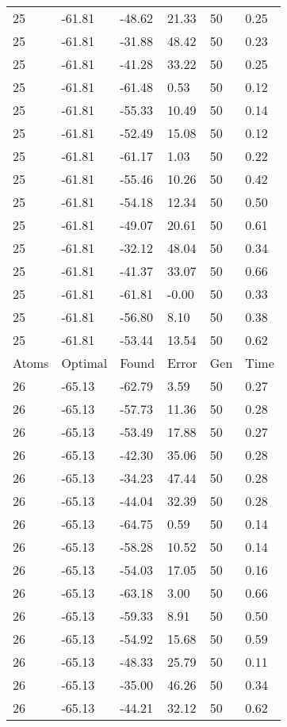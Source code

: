 \documentclass{report}
\begin{document}
\begin{appendix}
\begin{longtable}{llllll}
25 & -61.81 & -48.62 & 21.33 & 50 & 0.25 \\
25 & -61.81 & -31.88 & 48.42 & 50 & 0.23 \\
25 & -61.81 & -41.28 & 33.22 & 50 & 0.25 \\
25 & -61.81 & -61.48 & 0.53 & 50 & 0.12 \\
25 & -61.81 & -55.33 & 10.49 & 50 & 0.14 \\
25 & -61.81 & -52.49 & 15.08 & 50 & 0.12 \\
25 & -61.81 & -61.17 & 1.03 & 50 & 0.22 \\
25 & -61.81 & -55.46 & 10.26 & 50 & 0.42 \\
25 & -61.81 & -54.18 & 12.34 & 50 & 0.50 \\
25 & -61.81 & -49.07 & 20.61 & 50 & 0.61 \\
25 & -61.81 & -32.12 & 48.04 & 50 & 0.34 \\
25 & -61.81 & -41.37 & 33.07 & 50 & 0.66 \\
25 & -61.81 & -61.81 & -0.00 & 50 & 0.33 \\
25 & -61.81 & -56.80 & 8.10 & 50 & 0.38 \\
25 & -61.81 & -53.44 & 13.54 & 50 & 0.62 \\
Atoms & Optimal & Found & Error & Gen & Time \\
26 & -65.13 & -62.79 & 3.59 & 50 & 0.27 \\
26 & -65.13 & -57.73 & 11.36 & 50 & 0.28 \\
26 & -65.13 & -53.49 & 17.88 & 50 & 0.27 \\
26 & -65.13 & -42.30 & 35.06 & 50 & 0.28 \\
26 & -65.13 & -34.23 & 47.44 & 50 & 0.28 \\
26 & -65.13 & -44.04 & 32.39 & 50 & 0.28 \\
26 & -65.13 & -64.75 & 0.59 & 50 & 0.14 \\
26 & -65.13 & -58.28 & 10.52 & 50 & 0.14 \\
26 & -65.13 & -54.03 & 17.05 & 50 & 0.16 \\
26 & -65.13 & -63.18 & 3.00 & 50 & 0.66 \\
26 & -65.13 & -59.33 & 8.91 & 50 & 0.50 \\
26 & -65.13 & -54.92 & 15.68 & 50 & 0.59 \\
26 & -65.13 & -48.33 & 25.79 & 50 & 0.11 \\
26 & -65.13 & -35.00 & 46.26 & 50 & 0.34 \\
26 & -65.13 & -44.21 & 32.12 & 50 & 0.62 \\

\end{longtable}
\end{appendix}
\end{document}
